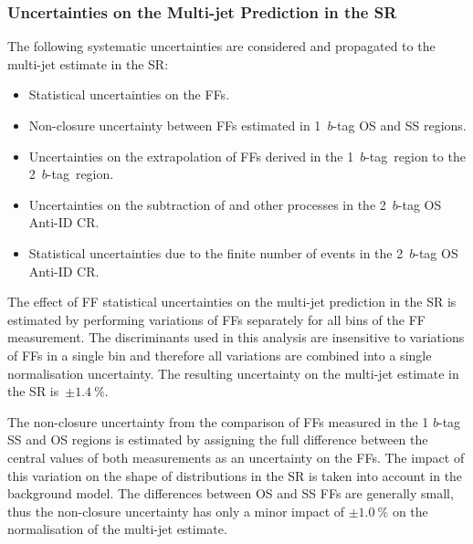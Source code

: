 \subsubsection{Uncertainties on the Multi-jet Prediction in the \hadhad SR}

%

The following systematic uncertainties are considered and propagated to the
multi-jet estimate in the \hadhad SR:
\begin{itemize}

\item Statistical uncertainties on the FFs.

\item Non-closure uncertainty between FFs estimated in 1~$b$-tag OS and SS
  regions.

\item Uncertainties on the extrapolation of FFs derived in the 1~$b$-tag~region
  to the 2~$b$-tag~region.

\item Uncertainties on the subtraction of \ttbar and other processes in the
  2~$b$-tag OS Anti-ID CR.

\item Statistical uncertainties due to the finite number of events in the
  2~$b$-tag OS Anti-ID CR.

\end{itemize}

The effect of FF statistical uncertainties on the multi-jet prediction in the SR
is estimated by performing variations of FFs separately for all bins of the FF
measurement. The discriminants used in this analysis are insensitive to
variations of FFs in a single bin and therefore all variations are combined into
a single normalisation uncertainty. The resulting uncertainty on the multi-jet
estimate in the SR is~$\pm \SI{1.4}{\percent}$.

The non-closure uncertainty from the comparison of FFs measured in the 1 $b$-tag
SS and OS regions is estimated by assigning the full difference between the
central values of both measurements as an uncertainty on the FFs. The impact of
this variation on the shape of distributions in the SR is taken into account in
the background model. The differences between OS and SS FFs are generally small,
thus the non-closure uncertainty has only a minor impact of
$\pm \SI{1.0}{\percent}$ on the normalisation of the multi-jet estimate.

